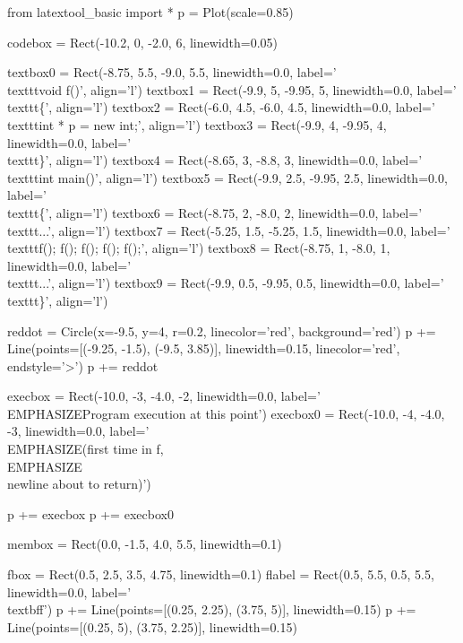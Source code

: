 \begin{python}
from latextool_basic import *
p = Plot(scale=0.85)

codebox = Rect(-10.2, 0, -2.0, 6, linewidth=0.05)

textbox0 = Rect(-8.75, 5.5, -9.0, 5.5, linewidth=0.0, label='\\texttt{void f()}', align='l')
textbox1 = Rect(-9.9, 5, -9.95, 5, linewidth=0.0, label='\\texttt{\{}', align='l')
textbox2 = Rect(-6.0, 4.5, -6.0, 4.5, linewidth=0.0, label='\\texttt{int * p = new int;}', align='l')
textbox3 = Rect(-9.9, 4, -9.95, 4, linewidth=0.0, label='\\texttt{\}}', align='l')
textbox4 = Rect(-8.65, 3, -8.8, 3, linewidth=0.0, label='\\texttt{int main()}', align='l')
textbox5 = Rect(-9.9, 2.5, -9.95, 2.5, linewidth=0.0, label='\\texttt{\{}', align='l')
textbox6 = Rect(-8.75, 2, -8.0, 2, linewidth=0.0, label='\\texttt{...}', align='l')
textbox7 = Rect(-5.25, 1.5, -5.25, 1.5, linewidth=0.0, label='\\texttt{f(); f(); f(); f(); f();}', align='l')
textbox8 = Rect(-8.75, 1, -8.0, 1, linewidth=0.0, label='\\texttt{...}', align='l')
textbox9 = Rect(-9.9, 0.5, -9.95, 0.5, linewidth=0.0, label='\\texttt{\}}', align='l')

reddot = Circle(x=-9.5, y=4, r=0.2, linecolor='red', background='red')
p += Line(points=[(-9.25, -1.5), (-9.5, 3.85)], linewidth=0.15, linecolor='red', endstyle='>')
p += reddot

execbox = Rect(-10.0, -3, -4.0, -2, linewidth=0.0,
               label='\\EMPHASIZE{Program execution at this point}')
execbox0 = Rect(-10.0, -4, -4.0, -3, linewidth=0.0,
               label='\\EMPHASIZE{(first time in f,} \\EMPHASIZE{\\newline about to return)}')

p += execbox
p += execbox0

membox = Rect(0.0, -1.5, 4.0, 5.5, linewidth=0.1)

fbox = Rect(0.5, 2.5, 3.5, 4.75, linewidth=0.1)
flabel = Rect(0.5, 5.5, 0.5, 5.5, linewidth=0.0, label='\\textbf{f}')
p += Line(points=[(0.25, 2.25), (3.75, 5)], linewidth=0.15)
p += Line(points=[(0.25, 5), (3.75, 2.25)], linewidth=0.15)


\end{python}
